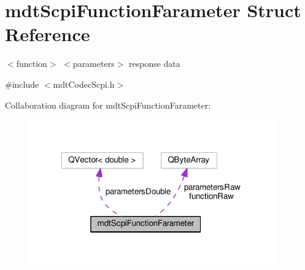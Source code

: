 \hypertarget{structmdt_scpi_function_farameter}{\section{mdt\-Scpi\-Function\-Farameter Struct Reference}
\label{structmdt_scpi_function_farameter}
}


$<$function$>$ $<$parameters$>$ response data  




{\ttfamily \#include $<$mdt\-Codec\-Scpi.\-h$>$}



Collaboration diagram for mdt\-Scpi\-Function\-Farameter\-:\nopagebreak
\begin{figure}[H]
\begin{center}
\leavevmode
\includegraphics[width=299pt]{structmdt_scpi_function_farameter__coll__graph}
\end{center}
\end{figure}
